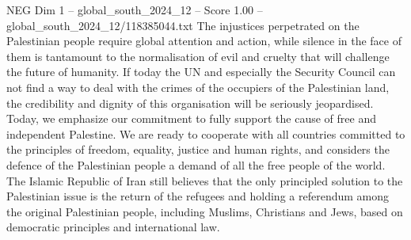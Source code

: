 \begin{textsample}{NEG Dim 1 – global\_south\_2024\_12 – Score 1.00 – global\_south\_2024\_12/118385044.txt}
The injustices perpetrated on the Palestinian people require global attention and action, while silence in the face of them is tantamount to the normalisation of evil and cruelty that will challenge the future of humanity.
If today the UN and especially the Security Council can not find a way to deal with the crimes of the occupiers of the Palestinian land, the credibility and dignity of this organisation will be seriously jeopardised.
Today, we emphasize our commitment to fully support the cause of free and independent Palestine.
We are ready to cooperate with all countries committed to the principles of freedom, equality, justice and human rights, and considers the defence of the Palestinian people a demand of all the free people of the world.
The Islamic Republic of Iran still believes that the only principled solution to the Palestinian issue is the return of the refugees and holding a referendum among the original Palestinian people, including Muslims, Christians and Jews, based on democratic principles and international law.

\end{textsample}
